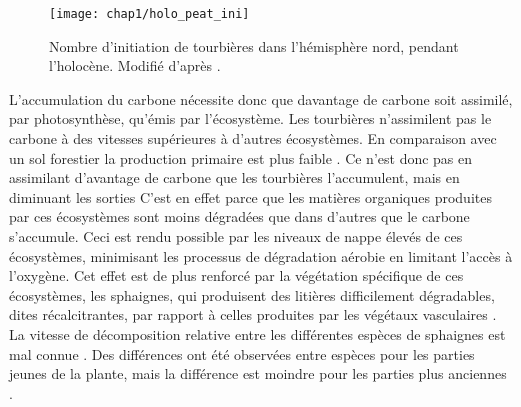 \begin{figure}
\centering
\texttt{[image: chap1/holo\_peat\_ini]}
\caption{Nombre d'initiation de tourbières dans l'hémisphère nord, pendant l'holocène. Modifié d'après \citep{macdonald2006}.}
\label{fig:holo_peat_ini}
\end{figure}

L'accumulation du carbone nécessite donc que davantage de carbone soit assimilé, par photosynthèse, qu'émis par l'écosystème.
Les tourbières n'assimilent pas le carbone à des vitesses supérieures à d'autres écosystèmes.
En comparaison avec un sol forestier la production primaire est plus faible \plop.
Ce n'est donc pas en assimilant d'avantage de carbone que les tourbières l'accumulent, mais en diminuant les sorties
C'est en effet parce que les matières organiques produites par ces écosystèmes sont moins dégradées que dans d'autres que le carbone s'accumule.
Ceci est rendu possible par les niveaux de nappe élevés de ces écosystèmes, minimisant les processus de dégradation aérobie en limitant l'accès à l'oxygène.
Cet effet est de plus renforcé par la végétation spécifique de ces écosystèmes, les sphaignes, qui produisent des litières difficilement dégradables, dites récalcitrantes, par rapport à celles produites par les végétaux vasculaires \citep{hobbie1996,liu2000}.
La vitesse de décomposition relative entre les différentes espèces de sphaignes est mal connue \citep{cornelissen2007}.
Des différences ont été observées entre espèces pour les parties jeunes de la plante, mais la différence est moindre pour les parties plus anciennes \citep{limpens2003}.


